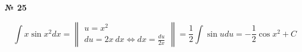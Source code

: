 \documentclass{article}
\begin{document}
\textbf{№ 25} 

$$ \int x \sin{x^2} dx 
= \begin{Vmatrix}  u = x^2 \\
                  du = 2x \ dx \Leftrightarrow dx = \frac{du}{2x} \end{Vmatrix}
= \frac{1}{2} \int \sin{u}du
= - \frac{1}{2} \cos{x^2} + C $$
\end{document}
